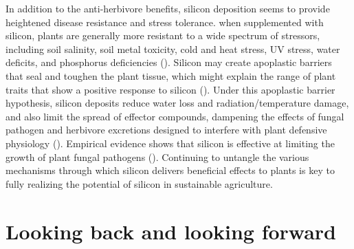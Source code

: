 \documentclass[12pt, letterpaper, ]{report}
\begin{document}
In addition to the anti-herbivore benefits, silicon deposition seems to provide heightened disease resistance and stress tolerance. when supplemented with silicon, plants are generally more resistant to a wide spectrum of stressors, including soil salinity, soil metal toxicity, cold and heat stress, UV stress, water deficits, and phosphorus deficiencies (\cite{cooke_consistent_2016}). Silicon may create apoplastic barriers that seal and toughen the plant tissue, which might explain the range of plant traits that show a positive response to silicon (\cite{coskun_controversies_2019}). Under this apoplastic barrier hypothesis, silicon deposits reduce water loss and radiation/temperature damage, and also limit the spread of effector compounds, dampening the effects of fungal pathogen and herbivore excretions designed to interfere with plant defensive physiology (\cite{coskun_controversies_2019}). Empirical evidence shows that silicon is effective at limiting the growth of plant fungal pathogens (\cite{fauteux_silicon_2005}). Continuing to untangle the various mechanisms through which silicon delivers beneficial effects to plants is key to fully realizing the potential of silicon in sustainable agriculture.

\section{Looking back and looking forward}
\end{document}

